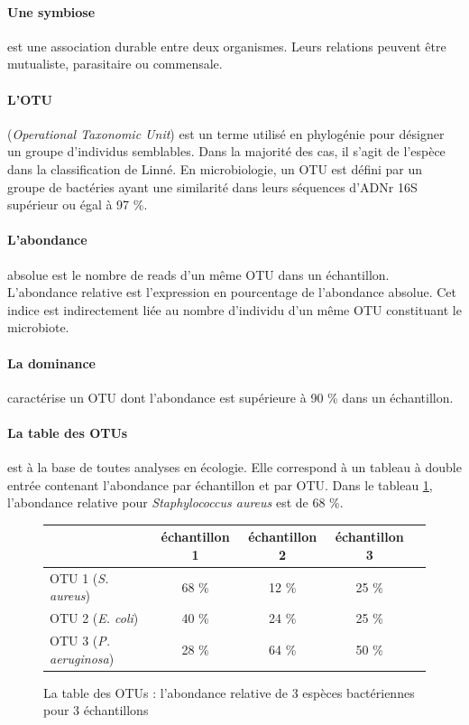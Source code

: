 \documentclass[12pt,a4paper]{article}
\begin{document}
\paragraph{Une symbiose} est une association durable entre deux organismes. Leurs relations peuvent être mutualiste, parasitaire ou commensale.


\paragraph{L'OTU}(\textit{Operational Taxonomic Unit}) est un terme utilisé en phylogénie pour désigner un groupe d’individus semblables. Dans la majorité des cas, il s'agit de l'espèce dans la classification de Linné.
En microbiologie, un OTU est défini par un groupe de bactéries ayant une similarité dans leurs séquences d'ADNr 16S supérieur ou égal à 97 \%.

\paragraph{L'abondance} absolue est le nombre de reads d'un même OTU dans un échantillon. 
L’abondance relative est l'expression en pourcentage de l'abondance absolue. Cet indice est indirectement liée au nombre d'individu d'un même OTU constituant le microbiote.

\paragraph{La dominance} caractérise un OTU dont l'abondance est supérieure à 90 \% dans un échantillon.


\paragraph{La table des OTUs} est à la base de toutes analyses en écologie. Elle correspond à un tableau à double entrée contenant l’abondance par échantillon et par OTU. Dans le tableau \ref{OTUTABLE}, l'abondance relative pour \textit{Staphylococcus aureus} est de 68 \%.

\begin{figure}[h]
\begin{center}
\begin{tabular}{|l|c|c|c|c}
  \hline
   & échantillon 1 & échantillon 2 & échantillon 3  \\
  \hline
  OTU 1 (\textit{S. aureus}) & 68 \% & 12 \% & 25 \% \\
  OTU 2 (\textit{E. coli})& 40 \% & 24 \% & 25 \% \\
  OTU 3 (\textit{P. aeruginosa}) & 28 \% & 64 \% & 50 \% \\

  \hline
\end{tabular}
\end{center}
\caption{La table des OTUs : l'abondance relative de 3 espèces bactériennes pour 3 échantillons}
\label{OTUTABLE}
\end{figure}
\end{document}
